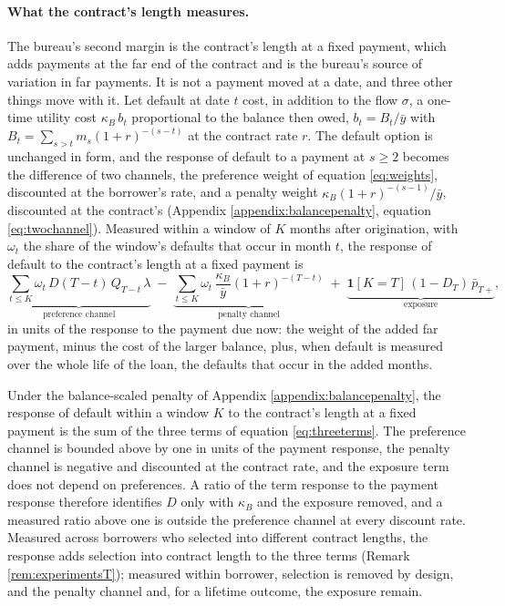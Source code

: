 \paragraph{What the contract's length measures.} The bureau's second margin is the contract's length at a fixed payment, which adds payments at the far end of the contract and is the bureau's source of variation in far payments. It is not a payment moved at a date, and three other things move with it. Let default at date $t$ cost, in addition to the flow $\sigma$, a one-time utility cost $\kappa_B\, b_t$ proportional to the balance then owed, $b_t = B_t/\bar y$ with $B_t = \sum_{s>t} m_s (1+r)^{-(s-t)}$ at the contract rate $r$. The default option is unchanged in form, and the response of default to a payment at $s \ge 2$ becomes the difference of two channels, the preference weight of equation \eqref{eq:weights}, discounted at the borrower's rate, and a penalty weight $\kappa_B(1+r)^{-(s-1)}/\bar y$, discounted at the contract's (Appendix \ref{appendix:balancepenalty}, equation \eqref{eq:twochannel}). Measured within a window of $K$ months after origination, with $\omega_t$ the share of the window's defaults that occur in month $t$, the response of default to the contract's length at a fixed payment is
\begin{equation}\label{eq:threeterms}
\underbrace{\sum_{t \le K}\omega_t\, D(T-t)\, Q_{T-t}\, \lambda}_{\text{preference channel}}
\;-\;
\underbrace{\sum_{t \le K}\omega_t\, \frac{\kappa_B}{\bar y}(1+r)^{-(T-t)}}_{\text{penalty channel}}
\;+\;
\underbrace{\mathbf{1}[K = T]\,(1 - D_T)\,\bar p_{T+}}_{\text{exposure}},
\end{equation}
in units of the response to the payment due now: the weight of the added far payment, minus the cost of the larger balance, plus, when default is measured over the whole life of the loan, the defaults that occur in the added months.

\begin{proposition}\label{prop:termmargin}
Under the balance-scaled penalty of Appendix \ref{appendix:balancepenalty}, the response of default within a window $K$ to the contract's length at a fixed payment is the sum of the three terms of equation \eqref{eq:threeterms}. The preference channel is bounded above by one in units of the payment response, the penalty channel is negative and discounted at the contract rate, and the exposure term does not depend on preferences. A ratio of the term response to the payment response therefore identifies $D$ only with $\kappa_B$ and the exposure removed, and a measured ratio above one is outside the preference channel at every discount rate. Measured across borrowers who selected into different contract lengths, the response adds selection into contract length to the three terms (Remark \ref{rem:experimentsT}); measured within borrower, selection is removed by design, and the penalty channel and, for a lifetime outcome, the exposure remain.
\end{proposition}

